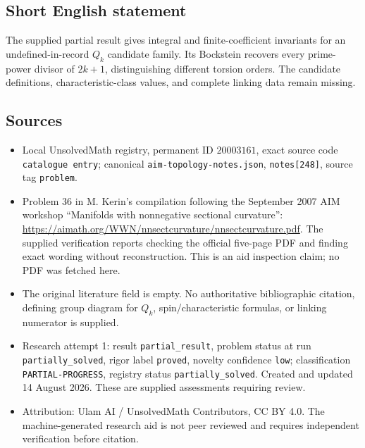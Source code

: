 \documentclass[11pt]{article}
\begin{document}
\subsection{Short English statement}
The supplied partial result gives integral and finite-coefficient invariants for an undefined-in-record \(Q_k\) candidate family. Its Bockstein recovers every prime-power divisor of \(2k+1\), distinguishing different torsion orders. The candidate definitions, characteristic-class values, and complete linking data remain missing.
\subsection{Sources}
\begin{itemize}
\item Local UnsolvedMath registry, permanent ID \(20003161\), exact source code \texttt{catalogue entry}; canonical \texttt{aim-topology-notes.json}, \texttt{notes[248]}, source tag \texttt{problem}.
\item Problem 36 in M. Kerin's compilation following the September 2007 AIM workshop ``Manifolds with nonnegative sectional curvature'': \url{https://aimath.org/WWN/nnsectcurvature/nnsectcurvature.pdf}. The supplied verification reports checking the official five-page PDF and finding exact wording without reconstruction. This is an aid inspection claim; no PDF was fetched here.
\item The original literature field is empty. No authoritative bibliographic citation, defining group diagram for \(Q_k\), spin/characteristic formulas, or linking numerator is supplied.
\item Research attempt 1: result \texttt{partial\_result}, problem status at run \texttt{partially\_solved}, rigor label \texttt{proved}, novelty confidence \texttt{low}; classification \texttt{PARTIAL-PROGRESS}, registry status \texttt{partially\_solved}. Created and updated 14 August 2026. These are supplied assessments requiring review.
\item Attribution: Ulam AI / UnsolvedMath Contributors, CC BY 4.0. The machine-generated research aid is not peer reviewed and requires independent verification before citation.
\end{itemize}
\end{document}
